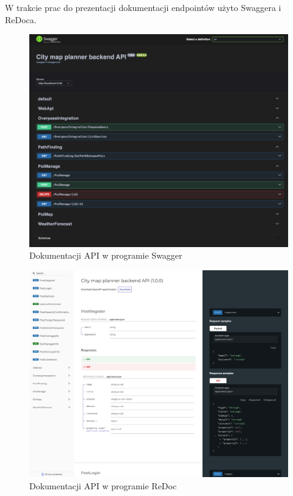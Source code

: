 W trakcie prac do prezentacji dokumentacji endpointów użyto Swaggera i ReDoca.

\begin{figure}[H]
\centering
\includegraphics[width=1\textwidth]{attachments/swagger}
\caption{Dokumentacji API w programie Swagger}
\label{fig:figure}
\end{figure}

\begin{figure}[H]
\centering
\includegraphics[width=1\textwidth]{attachments/redoc}
\caption{Dokumentacji API w programie ReDoc}
\label{fig:figure}
\end{figure}

